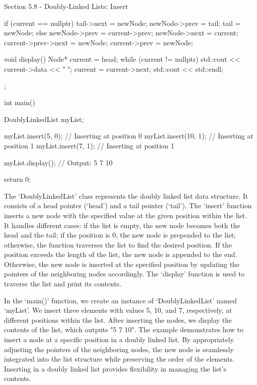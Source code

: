 \begin{notes}{Section 5.8 - Doubly-Linked Lists: Insert}
\begin{highlight}
\begin{code}[C++]
{{{                    if (current == nullptr) {
                        tail->next = newNode;
                        newNode->prev = tail;
                        tail = newNode;
                    } else {
                        newNode->prev = current->prev;
                        newNode->next = current;
                        current->prev->next = newNode;
                        current->prev = newNode;
                    }
                }
            }
        
            void display() {
                Node* current = head;
                while (current != nullptr) {
                    std::cout << current->data << " ";
                    current = current->next;
                }
                std::cout << std::endl;
            }
        };
        
        int main() {
            DoublyLinkedList myList;
        
            myList.insert(5, 0);   // Inserting at position 0
            myList.insert(10, 1);  // Inserting at position 1
            myList.insert(7, 1);   // Inserting at position 1
        
            myList.display();  // Output: 5 7 10
        
            return 0;
        }        
        \end{code}
        The `DoublyLinkedList' class represents the doubly linked list data structure. It consists of a head pointer (`head') and a tail pointer (`tail'). The `insert' function inserts a new node with the specified value at the given position within the list. It handles different cases: if the list is empty, the new node 
        becomes both the head and the tail; if the position is 0, the new node is prepended to the list; otherwise, the function traverses the list to find the desired position. If the position exceeds the length of the list, the new node is appended to the end. Otherwise, the new node is inserted at the specified position 
        by updating the pointers of the neighboring nodes accordingly. The `display' function is used to traverse the list and print its contents.
    
        In the `main()' function, we create an instance of `DoublyLinkedList' named `myList'. We insert three elements with values 5, 10, and 7, respectively, at different positions within the list. After inserting the nodes, we display the contents of the list, which outputs "5 7 10". The example demonstrates how to insert 
        a node at a specific position in a doubly linked list. By appropriately adjusting the pointers of the neighboring nodes, the new node is seamlessly integrated into the list structure while preserving the order of the elements. Inserting in a doubly linked list provides flexibility in managing the list's contents.
    \end{highlight}
\end{notes}

